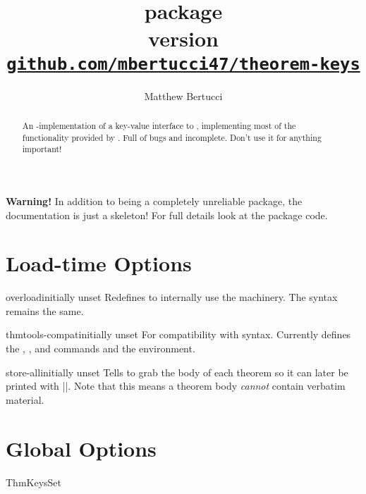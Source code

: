 \documentclass{ltxdoc}
\title{
	\pkg{theorem-keys} package \\[1ex]
	\large version \version \\[1ex]
	\href{https://github.com/mbertucci47/theorem-keys}
	  {\texttt{github.com/mbertucci47/theorem-keys}}
	}
\author{Matthew Bertucci}
\begin{document}
\maketitle

\begin{abstract}
An -implementation of a key-value interface to , implementing most of the functionality provided by . Full of bugs and incomplete. Don't use it for anything important!
\end{abstract}

\begin{tcolorbox}[colframe=red,colback=red!10!white]
\textbf{Warning!} In addition to being a completely unreliable package, the documentation is just a skeleton! For full details look at the package code.
\end{tcolorbox}

\section{Load-time Options}

\begin{docKey}{overload}{}{initially unset}
Redefines  to internally use the  machinery. The syntax remains the same.
\end{docKey}

\begin{docKey}{thmtools-compat}{}{initially unset}
For compatibility with  syntax. Currently defines the , , and  commands and the  environment. 
\end{docKey}

\begin{docKey}{store-all}{}{initially unset}
Tells  to grab the body of each theorem so it can later be
printed with ||. Note that this means a theorem body
\emph{cannot} contain verbatim material.
\end{docKey}
    
\section{Global Options}

\begin{docCommand}{ThmKeysSet}{}

\end{docCommand}
\end{document}
